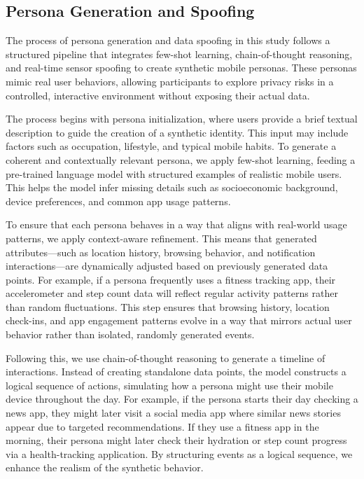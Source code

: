 \documentclass[acmlarge, nonacm]{acmart}
\begin{document}
\subsection{Persona Generation and Spoofing}

The process of persona generation and data spoofing in this study follows a structured pipeline that integrates few-shot learning, chain-of-thought reasoning, and real-time sensor spoofing to create synthetic mobile personas. These personas mimic real user behaviors, allowing participants to explore privacy risks in a controlled, interactive environment without exposing their actual data.

The process begins with persona initialization, where users provide a brief textual description to guide the creation of a synthetic identity. This input may include factors such as occupation, lifestyle, and typical mobile habits. To generate a coherent and contextually relevant persona, we apply few-shot learning, feeding a pre-trained language model with structured examples of realistic mobile users. This helps the model infer missing details such as socioeconomic background, device preferences, and common app usage patterns.

To ensure that each persona behaves in a way that aligns with real-world usage patterns, we apply context-aware refinement. This means that generated attributes—such as location history, browsing behavior, and notification interactions—are dynamically adjusted based on previously generated data points. For example, if a persona frequently uses a fitness tracking app, their accelerometer and step count data will reflect regular activity patterns rather than random fluctuations. This step ensures that browsing history, location check-ins, and app engagement patterns evolve in a way that mirrors actual user behavior rather than isolated, randomly generated events.

Following this, we use chain-of-thought reasoning to generate a timeline of interactions. Instead of creating standalone data points, the model constructs a logical sequence of actions, simulating how a persona might use their mobile device throughout the day. For example, if the persona starts their day checking a news app, they might later visit a social media app where similar news stories appear due to targeted recommendations. If they use a fitness app in the morning, their persona might later check their hydration or step count progress via a health-tracking application. By structuring events as a logical sequence, we enhance the realism of the synthetic behavior.
\end{document}
